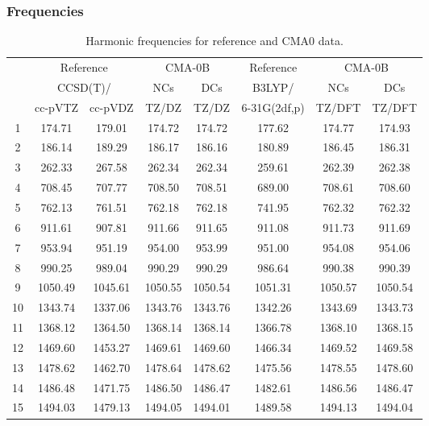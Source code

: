 \documentclass[10pt,oneside]{article}
\begin{document}
\subsubsection*{Frequencies}
\begin{table}[h!]
\centering
\caption{Harmonic frequencies for reference and CMA0 data.}
\begin{tabular}{cccccccc}
\toprule
{} & \multicolumn{2}{c}{Reference} & \multicolumn{2}{c}{CMA-0B} &    Reference & \multicolumn{2}{c}{CMA-0B} \\
{} & \multicolumn{2}{c}{CCSD(T)/} &     NCs &     DCs &       B3LYP/ &     NCs &     DCs \\
{} &   cc-pVTZ & cc-pVDZ &   TZ/DZ &   TZ/DZ & 6-31G(2df,p) &  TZ/DFT &  TZ/DFT \\
\midrule
1  &    174.71 &  179.01 &  174.72 &  174.72 &       177.62 &  174.77 &  174.93 \\
2  &    186.14 &  189.29 &  186.17 &  186.16 &       180.89 &  186.45 &  186.31 \\
3  &    262.33 &  267.58 &  262.34 &  262.34 &       259.61 &  262.39 &  262.38 \\
4  &    708.45 &  707.77 &  708.50 &  708.51 &       689.00 &  708.61 &  708.60 \\
5  &    762.13 &  761.51 &  762.18 &  762.18 &       741.95 &  762.32 &  762.32 \\
6  &    911.61 &  907.81 &  911.66 &  911.65 &       911.08 &  911.73 &  911.69 \\
7  &    953.94 &  951.19 &  954.00 &  953.99 &       951.00 &  954.08 &  954.06 \\
8  &    990.25 &  989.04 &  990.29 &  990.29 &       986.64 &  990.38 &  990.39 \\
9  &   1050.49 & 1045.61 & 1050.55 & 1050.54 &      1051.31 & 1050.57 & 1050.54 \\
10 &   1343.74 & 1337.06 & 1343.76 & 1343.76 &      1342.26 & 1343.69 & 1343.73 \\
11 &   1368.12 & 1364.50 & 1368.14 & 1368.14 &      1366.78 & 1368.10 & 1368.15 \\
12 &   1469.60 & 1453.27 & 1469.61 & 1469.60 &      1466.34 & 1469.52 & 1469.58 \\
13 &   1478.62 & 1462.70 & 1478.64 & 1478.62 &      1475.56 & 1478.55 & 1478.60 \\
14 &   1486.48 & 1471.75 & 1486.50 & 1486.47 &      1482.61 & 1486.56 & 1486.47 \\
15 &   1494.03 & 1479.13 & 1494.05 & 1494.01 &      1489.58 & 1494.13 & 1494.04 \\

\end{tabular}
\end{table}
\end{document}
